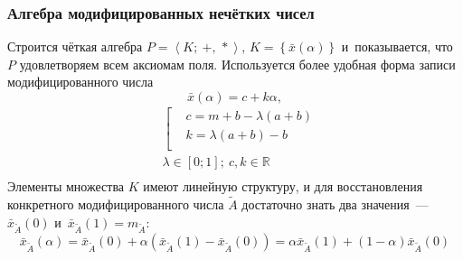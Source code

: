 \documentclass[12pt]{beamer}
\begin{document}
\begin{frame}
  \frametitle{Алгебра модифицированных нечётких чисел}
  Строится чёткая алгебра $P=\left\langle K ;\ +,\,* \right\rangle$, $K=\left\lbrace \bar x(\alpha) \right\rbrace$ и~показывается, что $P$ удовлетворяем всем аксиомам поля. Используется более удобная форма записи модифицированного числа
  \begin{equation}
    \bar{x}\left( \alpha  \right)=c+k\alpha,
  \end{equation}
  \begin{equation}
    \label{eq:modified-number-from-abm}
    \begin{aligned}
      & \left[ \begin{aligned}
      & c=m+b-\lambda \left( a+b \right) \\ 
      & k=\lambda \left( a+b \right)-b \\ 
    \end{aligned} \right. \\ 
    & \lambda \in \left[ 0;1 \right];\ c,k\in \mathbb{R} \\ 
  \end{aligned}
  \end{equation}
  Элементы множества $K$ имеют линейную структуру, и для восстановления конкретного модифицированного числа $\tilde{A}$ достаточно знать два значения~--- $\bar{x}_{\tilde A}\left( 0 \right)$ и~$\bar{x}_{\tilde A}\left( 1 \right)=m_{\tilde A}$:
  \begin{equation}
    \label{eq:isomorphic-field}
    \bar{x}_{\tilde A}\left( \alpha \right)=\bar{x}_{\tilde A}\left( 0 \right)+\alpha \left(\bar{x}_{\tilde A}\left( 1 \right)-\bar{x}_{\tilde A}\left(0 \right) \right)=\alpha \bar{x}_{\tilde A}\left( 1 \right)+\left( 1-\alpha  \right) \bar{x}_{\tilde A}\left( 0 \right)
  \end{equation}
\end{frame}
\end{document}
